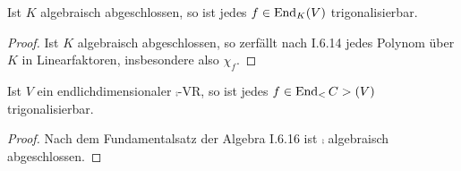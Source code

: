 \begin{conclusion}
	Ist $K$ algebraisch abgeschlossen, so ist jedes $f\in\operatorname{End}_K(V)$ trigonalisierbar.
\end{conclusion}
\begin{proof}
	Ist $K$ algebraisch abgeschlossen, so zerfällt nach I.6.14 jedes Polynom über $K$ in Linearfaktoren, insbesondere also $\chi_f$. %
\end{proof}

\begin{conclusion}
	Ist $V$ ein endlichdimensionaler $\comp$-VR, so ist jedes $f\in\End_\comp(V)$ trigonalisierbar.
\end{conclusion}
\begin{proof}
	Nach dem Fundamentalsatz der Algebra I.6.16 ist $\comp$ algebraisch abgeschlossen. %
\end{proof}